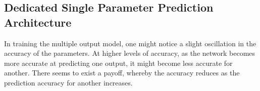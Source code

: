 \documentclass[11pt,oneside,openany,a4paper,english, report, goldenblock
]{usthesis}
\begin{document}
\begin{figure}[h]
\end{figure}

\subsection{Dedicated Single Parameter Prediction Architecture}
\label{chap:ConvolutionalNeuralNetwork-section:SingleParameterPredictionArchitecture}
In training the multiple output model, one might notice a slight oscillation in the accuracy of the parameters. At higher levels of accuracy, as the network becomes more accurate at predicting one output, it might become less accurate for another. There seems to exist a payoff, whereby the accuracy reduces as the prediction accuracy for another increases.
\end{document}
